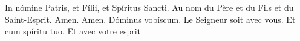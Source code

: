 In nómine Patris, et Fílii, et Spíritus Sancti.
Au nom du Père et du Fils et du Saint-Esprit.
Amen.
Amen.
Dóminus vobíscum.
Le Seigneur soit avec vous.
Et cum spíritu tuo.
Et avec votre esprit

